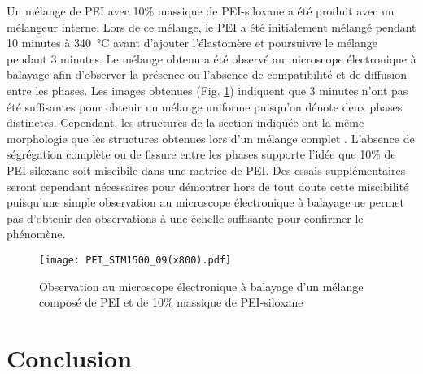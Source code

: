 Un mélange de PEI avec 10\% massique de PEI-siloxane a été produit avec un mélangeur interne. 
Lors de ce mélange, le PEI a été initialement mélangé pendant 10 minutes à \SI[locale=FR]{340}{\celsius} avant d'ajouter l'élastomère et poursuivre le mélange pendant 3 minutes. 
Le mélange obtenu a été observé au microscope électronique à balayage afin d'observer la présence ou l'absence de compatibilité et de diffusion entre les phases. 
Les images obtenues (Fig. \ref{fig:SEM_mix_STM1500_PEI}) indiquent que 3 minutes n'ont pas été suffisantes pour obtenir un mélange uniforme puisqu'on dénote deux phases distinctes. 
Cependant, les structures de la section indiquée ont la même morphologie que les structures obtenues lors d'un mélange complet \cite{Hatui2015}. 
L'absence de ségrégation complète ou de fissure entre les phases supporte l'idée que 10\% de PEI-siloxane soit miscibile dans une matrice de PEI. 
Des essais supplémentaires seront cependant nécessaires pour démontrer hors de tout doute cette miscibilité puisqu'une simple observation au microscope électronique à balayage ne permet pas d'obtenir des observations à une échelle suffisante pour confirmer le phénomène. 

\begin{figure}[h]
	\centering
	\texttt{[image: PEI\_STM1500\_09(x800).pdf]}
	\caption{Observation au microscope électronique à balayage d'un mélange composé de PEI et de 10\% massique de PEI-siloxane}
	\label{fig:SEM_mix_STM1500_PEI}
\end{figure}

\FloatBarrier
\section{Conclusion}


